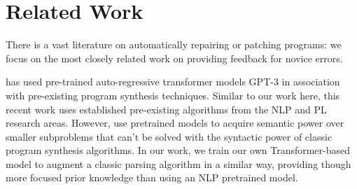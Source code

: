 \section{Related Work}
\label{sec:related-work}

There is a vast literature on automatically repairing or patching programs:
we focus on the most closely related work on providing feedback for novice errors.


%
\citep{Rahmani2021, Verbruggen2021} has used pre-trained auto-regressive
transformer models \ie GPT-3 \citep{?} in association with pre-existing program
synthesis techniques. Similar to our work here, this recent work uses
established pre-existing algorithms from the NLP and PL research areas. However,
\citep{Rahmani2021, Verbruggen2021} use pretrained models to acquire semantic
power over smaller subproblems that can't be solved with the syntactic power of
classic program synthesis algorithms. In our work, we train our own
Transformer-based model to augment a classic parsing algorithm in a similar way,
providing though more focused prior knowledge than using an NLP pretrained
model.




